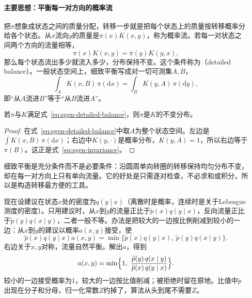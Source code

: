 \paragraph{主要思想：平衡每一对方向的概率流}
把$\pi$想象成状态之间的质量分配，转移一步就是把每个状态上的质量按转移概率分给各个状态。从$x$流向$y$的质量是$\pi(x)K(x,y)$，称为概率流。若每一对状态之间两个方向的流量相等，
\begin{equation}
  \pi(x)K(x,y)=\pi(y)K(y,x),
  \label{eq:sgen-detailed-balance-discrete}
\end{equation}
那么每个状态流出多少就流入多少，分布保持不变。这个条件称为（detailed balance）。一般状态空间上，细致平衡写成对一切可测集$A,B$，
\begin{equation}
  \int_{A}K(x,B)\,\pi(\mathrm{d}x)=\int_{B}K(y,A)\,\pi(\mathrm{d}y),
  \label{eq:sgen-detailed-balance}
\end{equation}
即“从$A$流进$B$”等于“从$B$流进$A$”。

\begin{lemma}[细致平衡蕴含不变性]
\label{lem:sgen-detailed-balance}
若$\pi$与$K$满足式~\eqref{eq:sgen-detailed-balance}，则$\pi$是$K$的不变分布。
\end{lemma}

\begin{proof}
在式~\eqref{eq:sgen-detailed-balance}中取$A$为整个状态空间。左边是$\int K(x,B)\,\pi(\mathrm{d}x)$；右边中$K(y,\cdot)$是概率分布，$K(y,A)=1$，所以右边等于$\pi(B)$。这正是式~\eqref{eq:sgen-invariance}。
\end{proof}

细致平衡是充分条件而不是必要条件：沿圆周单向转圈的转移保持均匀分布不变，却在每一对方向上只有单向流量。它的好处是只需逐对检查，不必求和或积分，所以是构造转移最方便的工具。

现在设建议在状态$x$处的密度为$q(y\mid x)$（离散时是概率，连续时是关于Lebesgue测度的密度）。只用建议时，从$x$到$y$的流量正比于$\widetilde{p}(x)q(y\mid x)$，反向流量正比于$\widetilde{p}(y)q(x\mid y)$，二者一般不等。办法是把较大的一边按比例削减到较小的一边：从$x$到$y$的建议以概率$a(x,y)$接受，使
\[
  \widetilde{p}(x)q(y\mid x)a(x,y)=\min\bigl\{\widetilde{p}(x)q(y\mid x),\ \widetilde{p}(y)q(x\mid y)\bigr\}.
\]
右边关于$x,y$对称，流量自然平衡。解出$a$，得到
\begin{equation}
  a(x,y)=\min\Bigl\{1,\ \frac{\widetilde{p}(y)\,q(x\mid y)}{\widetilde{p}(x)\,q(y\mid x)}\Bigr\}.
  \label{eq:sgen-mh-acceptance}
\end{equation}
较小的一边接受概率为$1$，较大的一边按比值削减；被拒绝时留在原地。比值中$\widetilde{p}$出现在分子和分母，归一化常数$Z$约掉了，算法从头到尾不需要$Z$。

